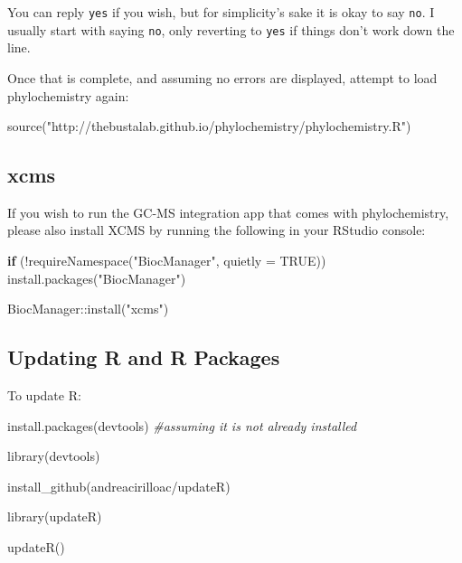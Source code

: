 \documentclass[
]{krantz}
\newenvironment{Shaded}{\begin{snugshade}}{\end{snugshade}}
\newcommand{\AttributeTok}[1]{\textcolor[rgb]{0.77,0.63,0.00}{#1}}
\newcommand{\CommentTok}[1]{\textcolor[rgb]{0.56,0.35,0.01}{\textit{#1}}}
\newcommand{\ConstantTok}[1]{\textcolor[rgb]{0.00,0.00,0.00}{#1}}
\newcommand{\ControlFlowTok}[1]{\textcolor[rgb]{0.13,0.29,0.53}{\textbf{#1}}}
\newcommand{\FunctionTok}[1]{\textcolor[rgb]{0.00,0.00,0.00}{#1}}
\newcommand{\NormalTok}[1]{#1}
\newcommand{\SpecialCharTok}[1]{\textcolor[rgb]{0.00,0.00,0.00}{#1}}
\newcommand{\StringTok}[1]{\textcolor[rgb]{0.31,0.60,0.02}{#1}}
\begin{document}
You can reply \texttt{yes} if you wish, but for simplicity's sake it is okay to say \texttt{no}. I usually start with saying \texttt{no}, only reverting to \texttt{yes} if things don't work down the line.

Once that is complete, and assuming no errors are displayed, attempt to load phylochemistry again:

\begin{Shaded}
\begin{Highlighting}[]
\FunctionTok{source}\NormalTok{(}\StringTok{"http://thebustalab.github.io/phylochemistry/phylochemistry.R"}\NormalTok{)}
\end{Highlighting}
\end{Shaded}

\hypertarget{xcms}{%
\subsection{xcms}\label{xcms}}

If you wish to run the GC-MS integration app that comes with phylochemistry, please also install XCMS by running the following in your RStudio console:

\begin{Shaded}
\begin{Highlighting}[]
\ControlFlowTok{if}\NormalTok{ (}\SpecialCharTok{!}\FunctionTok{requireNamespace}\NormalTok{(}\StringTok{"BiocManager"}\NormalTok{, }\AttributeTok{quietly =} \ConstantTok{TRUE}\NormalTok{))}
    \FunctionTok{install.packages}\NormalTok{(}\StringTok{"BiocManager"}\NormalTok{)}

\NormalTok{BiocManager}\SpecialCharTok{::}\FunctionTok{install}\NormalTok{(}\StringTok{"xcms"}\NormalTok{)}
\end{Highlighting}
\end{Shaded}

\hypertarget{updating-r-and-r-packages}{%
\subsection{Updating R and R Packages}\label{updating-r-and-r-packages}}

To update R:

\begin{Shaded}
\begin{Highlighting}[]

\FunctionTok{install.packages}\NormalTok{(}\StringTok{\textquotesingle{}devtools\textquotesingle{}}\NormalTok{) }\CommentTok{\#assuming it is not already installed}

\FunctionTok{library}\NormalTok{(devtools)}

\FunctionTok{install\_github}\NormalTok{(}\StringTok{\textquotesingle{}andreacirilloac/updateR\textquotesingle{}}\NormalTok{)}

\FunctionTok{library}\NormalTok{(updateR)}

\FunctionTok{updateR}\NormalTok{()}
\end{Highlighting}
\end{Shaded}
\end{document}
